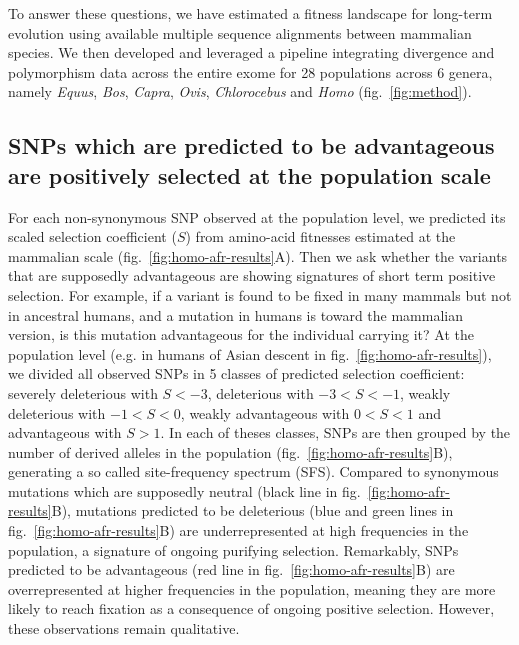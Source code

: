 \documentclass{article}
\newcommand{\Sphy}{S}
\newcommand{\divStrongDel}{\Sphy < -3}
\newcommand{\divDel}{-3 < \Sphy < -1}
\newcommand{\divWeakDel}{-1 < \Sphy < 0}
\newcommand{\divWeakAdv}{0 < \Sphy < 1}
\newcommand{\divAdv}{ \Sphy > 1}
\begin{document}
    To answer these questions, we have estimated a fitness landscape for long-term evolution using available multiple sequence alignments between mammalian species\cite{ranwez_orthomam_2007, howe_ensembl_2021}.
    We then developed and leveraged a pipeline integrating divergence and polymorphism data across the entire exome for 28 populations across 6 genera, namely \textit{Equus},  \textit{Bos}, \textit{Capra}, \textit{Ovis}, \textit{Chlorocebus} and \textit{Homo} (fig.~\ref{fig:method}).


    \subsection*{SNPs which are predicted to be advantageous are positively selected at the population scale}


    For each non-synonymous SNP observed at the population level, we predicted its scaled selection coefficient ($\Sphy$) from amino-acid fitnesses estimated at the mammalian scale (fig.~\ref{fig:homo-afr-results}A).
    Then we ask whether the variants that are supposedly advantageous are showing signatures of short term positive selection.
    For example, if a variant is found to be fixed in many mammals but not in ancestral humans, and a mutation in humans is toward the mammalian version, is this mutation advantageous for the individual carrying it?
    At the population level (e.g. in humans of Asian descent in fig.~\ref{fig:homo-afr-results}), we divided all observed SNPs in 5 classes of predicted selection coefficient: severely deleterious with $\divStrongDel$, deleterious with $\divDel$, weakly deleterious with $\divWeakDel$, weakly advantageous with $\divWeakAdv$ and advantageous with $\divAdv$.
    In each of theses classes, SNPs are then grouped by the number of derived alleles in the population (fig.~\ref{fig:homo-afr-results}B), generating a so called site-frequency spectrum (SFS).
    Compared to synonymous mutations which are supposedly neutral (black line in fig.~\ref{fig:homo-afr-results}B), mutations predicted to be deleterious (blue and green lines in fig.~\ref{fig:homo-afr-results}B) are underrepresented at high frequencies in the population, a signature of ongoing purifying selection.
    Remarkably, SNPs predicted to be advantageous (red line in fig.~\ref{fig:homo-afr-results}B) are overrepresented at higher frequencies in the population, meaning they are more likely to reach fixation as a consequence of ongoing positive selection.
    However, these observations remain qualitative.
\end{document}
